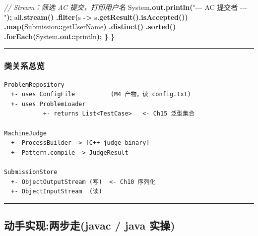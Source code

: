 \documentclass[
  11pt,
]{ctexart}
\newenvironment{Shaded}{\begin{snugshade}}{\end{snugshade}}
\newcommand{\BuiltInTok}[1]{#1}
\newcommand{\CommentTok}[1]{\textcolor[rgb]{0.56,0.35,0.01}{\textit{#1}}}
\newcommand{\FunctionTok}[1]{\textcolor[rgb]{0.13,0.29,0.53}{\textbf{#1}}}
\newcommand{\NormalTok}[1]{#1}
\newcommand{\OperatorTok}[1]{\textcolor[rgb]{0.81,0.36,0.00}{\textbf{#1}}}
\newcommand{\StringTok}[1]{\textcolor[rgb]{0.31,0.60,0.02}{#1}}
\begin{document}
\begin{Shaded}
\begin{Highlighting}[]
        \CommentTok{// Stream：筛选 AC 提交，打印用户名}
        \BuiltInTok{System}\OperatorTok{.}\FunctionTok{out}\OperatorTok{.}\FunctionTok{println}\OperatorTok{(}\StringTok{"{-}{-}{-} AC 提交者 {-}{-}{-}"}\OperatorTok{);}
\NormalTok{        all}\OperatorTok{.}\FunctionTok{stream}\OperatorTok{()}
            \OperatorTok{.}\FunctionTok{filter}\OperatorTok{(}\NormalTok{s }\OperatorTok{{-}\textgreater{}}\NormalTok{ s}\OperatorTok{.}\FunctionTok{getResult}\OperatorTok{().}\FunctionTok{isAccepted}\OperatorTok{())}
            \OperatorTok{.}\FunctionTok{map}\OperatorTok{(}\NormalTok{Submission}\OperatorTok{::}\NormalTok{getUserName}\OperatorTok{)}
            \OperatorTok{.}\FunctionTok{distinct}\OperatorTok{()}
            \OperatorTok{.}\FunctionTok{sorted}\OperatorTok{()}
            \OperatorTok{.}\FunctionTok{forEach}\OperatorTok{(}\BuiltInTok{System}\OperatorTok{.}\FunctionTok{out}\OperatorTok{::}\NormalTok{println}\OperatorTok{);}
    \OperatorTok{\}}
\OperatorTok{\}}
\end{Highlighting}
\end{Shaded}

\begin{center}\rule{0.5\linewidth}{0.5pt}\end{center}

\hypertarget{ux7c7bux5173ux7cfbux603bux89c8}{%
\subsubsection{类关系总览}\label{ux7c7bux5173ux7cfbux603bux89c8}}

\begin{verbatim}
ProblemRepository
  +- uses ConfigFile          (M4 产物，读 config.txt)
  +- uses ProblemLoader
           +- returns List<TestCase>   <- Ch15 泛型集合

MachineJudge
  +- ProcessBuilder -> [C++ judge binary]
  +- Pattern.compile -> JudgeResult

SubmissionStore
  +- ObjectOutputStream (写)  <- Ch10 序列化
  +- ObjectInputStream  (读)
\end{verbatim}

\begin{center}\rule{0.5\linewidth}{0.5pt}\end{center}

\hypertarget{ux52a8ux624bux5b9eux73b0ux4e24ux6b65ux8d70javac-java-ux5b9eux64cd-3}{%
\subsection{动手实现:两步走(javac / java
实操)}\label{ux52a8ux624bux5b9eux73b0ux4e24ux6b65ux8d70javac-java-ux5b9eux64cd-3}}
\end{document}

